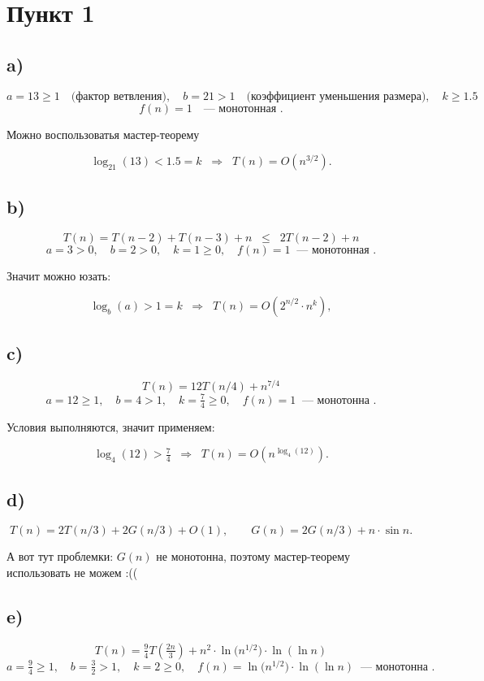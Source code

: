 \documentclass[12pt]{article}
\begin{document}
\section*{Пункт 1}

\subsection*{a)}
\[
a = 13 \geq 1 \quad \text{(фактор ветвления)}, \quad
b = 21 > 1 \quad \text{(коэффициент уменьшения размера)}, \quad
k \geq 1.5
\]
\[
f(n) = 1 \quad \text{--- монотонная }.
\]

Можно воспользоватья мастер-теорему

\[
\log_{21}(13) < 1.5 = k \;\;\Rightarrow\;\; T(n) = O\!\left(n^{3/2}\right).
\]

\subsection*{b)}
\[
T(n) = T(n-2) + T(n-3) + n \;\;\leq\;\; 2T(n-2) + n
\]
\[
a = 3 > 0, \quad b = 2 > 0, \quad k = 1 \geq 0, \quad f(n) = 1 \;\; \text{--- монотонная }.
\]

Значит можно юзать:

\[
\log_b(a) > 1 = k \;\;\Rightarrow\;\; T(n) = O\!\left(2^{n/2}\cdot n^k\right),
\]

\subsection*{c)}
\[
T(n) = 12T(n/4) + n^{7/4}
\]
\[
a = 12 \geq 1, \quad b = 4 > 1, \quad k = \tfrac{7}{4} \geq 0, \quad f(n) = 1 \;\; \text{--- монотонна }.
\]

Условия выполняются, значит применяем:

\[
\log_{4}(12) > \tfrac{7}{4} \;\;\Rightarrow\;\; T(n) = O\!\left(n^{\log_{4}(12)}\right).
\]

\subsection*{d)}
\[
T(n) = 2T(n/3) + 2G(n/3) + O(1), \qquad
G(n) = 2G(n/3) + n \cdot \sin n.
\]

А вот тут проблемки: $G(n)$  не монотонна, поэтому мастер-теорему использовать не можем :((

\subsection*{e)}
\[
T(n) = \tfrac{9}{4}T\!\left(\tfrac{2n}{3}\right) + n^2 \cdot \ln\!\big(n^{1/2}\big) \cdot \ln(\ln n)
\]
\[
a = \tfrac{9}{4} \geq 1, \quad b = \tfrac{3}{2} > 1, \quad k = 2 \geq 0, \quad f(n) = \ln\!\big(n^{1/2}\big)\cdot \ln(\ln n) \;\; \text{--- монотонна }.
\]
\end{document}
